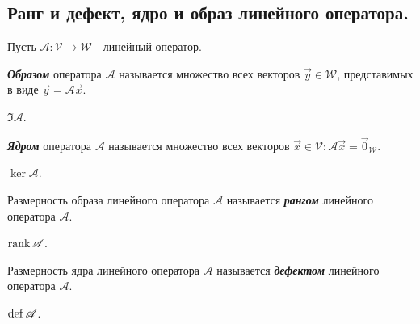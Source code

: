 \subsection{
    Ранг и дефект, ядро и образ линейного оператора.
}

Пусть $\mathscr{A} \colon \mathcal{V} \to \mathcal{W}$ - линейный оператор.

\begin{definition}
    \textbf{\textit{Образом}} оператора $\mathscr{A}$ называется множество всех векторов $\vec{y} \in \mathcal{W}$, представимых в виде $\vec{y} = \mathscr{A}\vec{x}$.
\end{definition}

\begin{designation}
    $\Im \mathscr{A}$.
\end{designation}

\begin{definition}
    \textbf{\textit{Ядром}} оператора $\mathscr{A}$ называется множество всех векторов $\vec{x} \in \mathcal{V} \colon \mathscr{A}\vec{x} = \vec{0}_{\mathcal{W}}$.
\end{definition}

\begin{designation}
    $\ker \mathscr{A}$.
\end{designation}

\begin{definition}
    Размерность образа линейного оператора $\mathscr{A}$ называется \textbf{\textit{рангом}} линейного оператора $\mathscr{A}$. 
\end{definition}

\begin{designation}
    $\operatorname{\mathop{\mathrm{rank}}} \mathscr{A}$.
\end{designation}

\begin{definition}
    Размерность ядра линейного оператора $\mathscr{A}$ называется \textbf{\textit{дефектом}} линейного оператора $\mathscr{A}$. 
\end{definition}

\begin{designation}
    $\operatorname{\mathop{\mathrm{def}}} \mathscr{A}$.
\end{designation}
